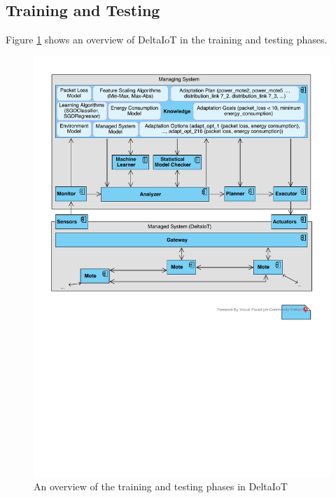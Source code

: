 \documentclass[a4paper,12pt]{article}
\begin{document}
\subsection{Training and Testing}
Figure \ref{DeltaIoTTrainingTestingView} shows an overview of DeltaIoT in the training and testing phases. 
\begin{figure}[H]
	\centering
	\includegraphics[keepaspectratio, width=\linewidth]{figures/DeltaIoTTrainingTestingView.pdf}
	\caption{An overview of the training and testing phases in DeltaIoT}
	\label{DeltaIoTTrainingTestingView}
\end{figure}
\end{document}

